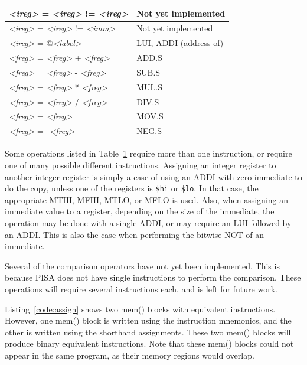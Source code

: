 \begin{table}
\begin{tabular}{|l|l|}
\emph{\textless ireg\textgreater} = \emph{\textless ireg\textgreater} != \emph{\textless ireg\textgreater} & Not yet implemented \\ \hline
\emph{\textless ireg\textgreater} = \emph{\textless ireg\textgreater} != \emph{\textless imm\textgreater} & Not yet implemented \\ \hline
\emph{\textless ireg\textgreater} = @\emph{\textless label\textgreater} & LUI, ADDI (address-of) \\ \hline
\emph{\textless freg\textgreater} = \emph{\textless freg\textgreater} + \emph{\textless freg\textgreater} & ADD.S \\ \hline
\emph{\textless freg\textgreater} = \emph{\textless freg\textgreater} - \emph{\textless freg\textgreater} & SUB.S \\ \hline
\emph{\textless freg\textgreater} = \emph{\textless freg\textgreater} * \emph{\textless freg\textgreater} & MUL.S \\ \hline
\emph{\textless freg\textgreater} = \emph{\textless freg\textgreater} / \emph{\textless freg\textgreater} & DIV.S \\ \hline
\emph{\textless freg\textgreater} = \emph{\textless freg\textgreater} & MOV.S \\ \hline
\emph{\textless freg\textgreater} = -\emph{\textless freg\textgreater} & NEG.S \\ \hline
\end{tabular}
\label{tab:operators}
\end{table}

Some operations listed in Table~\ref{tab:operators} require more
than one instruction, or require one of many possible different 
instructions.  Assigning an integer register to another integer 
register is simply a case of using an ADDI with zero immediate to 
do the copy, unless one of the registers is \texttt{\$hi} or \texttt{\$lo}.
In that case, the appropriate MTHI, MFHI, MTLO, or MFLO is used.
Also, when assigning an immediate value to a register, depending 
on the size of the immediate, the operation may be done with 
a single ADDI, or may require an LUI followed by an ADDI. This 
is also the case when performing the bitwise NOT of an immediate.

Several of the comparison operators have not yet been implemented.
This is because PISA does not have single instructions to 
perform the comparison.  These operations will require several 
instructions each, and is left for future work.

Listing~\ref{code:assign} shows two mem() blocks with equivalent 
instructions.  However, one mem() block is written using the 
instruction mnemonics, and the other is written using the 
shorthand assignments.  These two mem() blocks will produce binary
equivalent instructions.  Note that these mem() blocks could not 
appear in the same program, as their memory regions would overlap.

